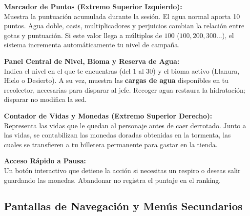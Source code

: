 \documentclass[11pt,a4paper]{article}
\begin{document}
\begin{enumerate}[label=\textbf{[\arabic*]}, itemsep=0.8em]
    \item \textbf{Marcador de Puntos (Extremo Superior Izquierdo):}\\
    Muestra la puntuación acumulada durante la sesión. El agua normal aporta 10 puntos. Agua doble, oasis, multiplicadores y perjuicios cambian la relación entre gotas y puntuación. Si este valor llega a múltiplos de $100$ ($100, 200, 300\dots$), el sistema incrementa automáticamente tu nivel de campaña.

    \item \textbf{Panel Central de Nivel, Bioma y Reserva de Agua:}\\
    Indica el nivel en el que te encuentras (del $1$ al $30$) y el bioma activo (Llanura, Hielo o Desierto). A su vez, muestra las \textbf{cargas de agua} disponibles en tu recolector, necesarias para disparar al jefe. Recoger agua restaura la hidratación; disparar no modifica la sed.

    \item \textbf{Contador de Vidas y Monedas (Extremo Superior Derecho):}\\
    Representa las vidas que le quedan al personaje antes de caer derrotado. Junto a las vidas, se contabilizan las monedas doradas obtenidas en la tormenta, las cuales se transfieren a tu billetera permanente para gastar en la tienda.

    \item \textbf{Acceso Rápido a Pausa:}\\
    Un botón interactivo que detiene la acción si necesitas un respiro o deseas salir guardando las monedas. Abandonar no registra el puntaje en el ranking.
\end{enumerate}

\subsection*{Pantallas de Navegación y Menús Secundarios}
\end{document}
